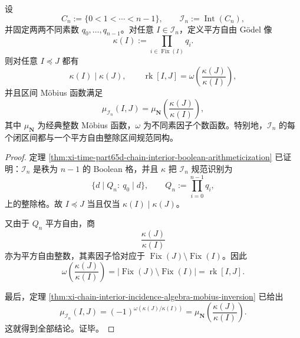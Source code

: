 \begin{theorem}\label{thm:conclusion-chain-interior-mobius-arithmetic-identification}
设
\[
C_n:=\{0<1<\cdots<n-1\},
\qquad
\mathcal I_n:=\operatorname{Int}(C_n),
\]
并固定两两不同素数 \(q_0,\dots,q_{n-1}\)。对任意 \(I\in\mathcal I_n\)，定义平方自由 Gödel 像
\[
\kappa(I):=\prod_{i\in \operatorname{Fix}(I)}q_i.
\]
则对任意 \(I\preceq J\) 都有
\[
\kappa(I)\mid \kappa(J),
\qquad
\operatorname{rk}[I,J]=\omega\!\left(\frac{\kappa(J)}{\kappa(I)}\right),
\]
并且区间 Möbius 函数满足
\[
\mu_{\mathcal I_n}(I,J)
=
\mu_{\mathbf N}\!\left(\frac{\kappa(J)}{\kappa(I)}\right),
\]
其中 \(\mu_{\mathbf N}\) 为经典整数 Möbius 函数，\(\omega\) 为不同素因子个数函数。特别地，\(\mathcal I_n\) 的每个闭区间都与一个平方自由整除区间规范同构。
\end{theorem}
\begin{proof}
定理 \ref{thm:xi-time-part65d-chain-interior-boolean-arithmeticization} 已证明：\(\mathcal I_n\) 是秩为 \(n-1\) 的 Boolean 格，并且 \(\kappa\) 把 \(\mathcal I_n\) 规范识别为
\[
\{d\mid Q_n:\ q_0\mid d\},
\qquad
Q_n:=\prod_{i=0}^{n-1}q_i,
\]
上的整除格。故 \(I\preceq J\) 当且仅当 \(\kappa(I)\mid\kappa(J)\)。

又由于 \(Q_n\) 平方自由，商
\[
\frac{\kappa(J)}{\kappa(I)}
\]
亦为平方自由整数，其素因子恰对应于 \(\operatorname{Fix}(J)\setminus\operatorname{Fix}(I)\)。因此
\[
\omega\!\left(\frac{\kappa(J)}{\kappa(I)}\right)
=
|\operatorname{Fix}(J)\setminus\operatorname{Fix}(I)|
=
\operatorname{rk}[I,J].
\]

最后，定理 \ref{thm:xi-chain-interior-incidence-algebra-mobius-inversion} 已给出
\[
\mu_{\mathcal I_n}(I,J)
=
(-1)^{\omega(\kappa(J)/\kappa(I))}
=
\mu_{\mathbf N}\!\left(\frac{\kappa(J)}{\kappa(I)}\right).
\]
这就得到全部结论。证毕。
\end{proof}

